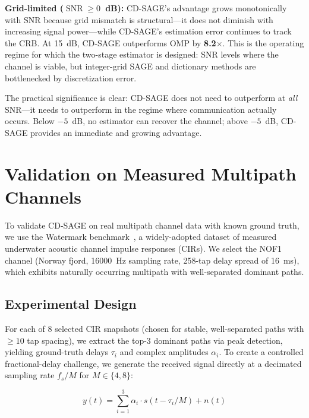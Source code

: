 \documentclass[journal]{IEEEtran}
\DeclareMathOperator{\SNR}{SNR}
\begin{document}
\textbf{Grid-limited ($\SNR \ge 0$~dB):} CD-SAGE's advantage grows monotonically with SNR because grid mismatch is structural---it does not diminish with increasing signal power---while CD-SAGE's estimation error continues to track the CRB. At \SI{+15}{dB}, CD-SAGE outperforms OMP by \textbf{8.2$\times$}. This is the operating regime for which the two-stage estimator is designed: SNR levels where the channel is viable, but integer-grid SAGE and dictionary methods are bottlenecked by discretization error.

The practical significance is clear: CD-SAGE does not need to outperform at \textit{all} SNR---it needs to outperform in the regime where communication actually occurs. Below $-5$~dB, no estimator can recover the channel; above $-5$~dB, CD-SAGE provides an immediate and growing advantage.

\section{Validation on Measured Multipath Channels}
\label{sec:watermark}

To validate CD-SAGE on real multipath channel data with known ground truth, we use the Watermark benchmark~\cite{watermark2017}, a widely-adopted dataset of measured underwater acoustic channel impulse responses (CIRs). We select the NOF1 channel (Norway fjord, \SI{16000}{Hz} sampling rate, 258-tap delay spread of \SI{16}{ms}), which exhibits naturally occurring multipath with well-separated dominant paths.

\subsection{Experimental Design}

For each of 8 selected CIR snapshots (chosen for stable, well-separated paths with $\ge10$ tap spacing), we extract the top-3 dominant paths via peak detection, yielding ground-truth delays $\tau_i$ and complex amplitudes $\alpha_i$. To create a controlled fractional-delay challenge, we generate the received signal directly at a decimated sampling rate $f_s / M$ for $M \in \{4, 8\}$:

\begin{equation}
y(t) = \sum_{i=1}^{3} \alpha_i \cdot s(t - \tau_i / M) + n(t)
\label{eq:wm_sig}
\end{equation}
\end{document}
